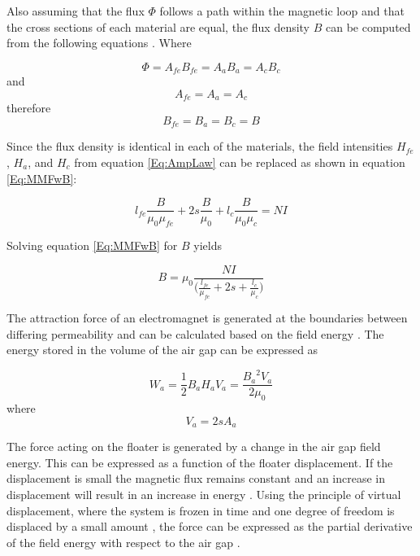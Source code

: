 Also assuming that the flux $\Phi$ follows a path within the magnetic loop and that the cross sections of each material are equal, the flux density $B$ can be computed from the following equations \cite{MagBear}. Where

\begin{equation}\label{Eq:BwFe}
\Phi={A}_{fe}{B}_{fe}={A}_{a}{B}_{a}={A}_{c}{B}_{c}
\end{equation}
 and
\begin{equation}\label{Eq:BwoFe}
{A}_{fe}={A}_{a}={A}_{c}
\end{equation}
therefore
\begin{equation}\label{Eq:BwFe}
{B}_{fe}={B}_{a}={B}_{c}=B
\end{equation}



Since the flux density is identical in each of the materials, the field intensities ${H}_{fe}$, ${H}_{a}$, and ${H}_{c}$ from equation \ref{Eq:AmpLaw} can be replaced as shown in equation \ref{Eq:MMFwB}:

\begin{equation}\label{Eq:MMFwB}
{l}_{fe}\frac{B}{{\mu}_{0}{\mu}_{fe}}+2s\frac{B}{{\mu}_{0}}+{l}_{c}\frac{B}{{\mu}_{0}{\mu}_{c}}=NI
\end{equation}

Solving equation \ref{Eq:MMFwB} for $B$ yields

\begin{equation}\label{Eq:B}
B={\mu}_{0}\frac{NI}{\Big(\frac{{l}_{fe}}{{\mu}_{fe}}+2s+\frac{{l}_{c}}{{\mu}_{c}}\Big)}
\end{equation}


The attraction force of an electromagnet is generated at the boundaries between differing permeability and can be calculated based on the field energy \cite{MagBear}.  The energy stored in the volume of the air gap can be expressed as

\begin{equation}\label{Eq:Wa}
{W}_{a}=\frac{1}{2}{B}_{a}{H}_{a}{V}_{a}=\frac{{{B}_{a}}^{2}{V}_{a}}{2{\mu}_{0}}
\end{equation}
where
\begin{equation}\label{Eq:Va}
{V}_{a}=2s{A}_{a}
\end{equation}

The force acting on the floater is generated by a change in the air gap field energy. This can be expressed as a function of the floater displacement. If the displacement is small the magnetic flux remains constant and an increase in displacement will result in an increase in energy \cite{MagBear}. Using the principle of virtual displacement, where the system is frozen in time and one degree of freedom is displaced by a small amount \cite{AnaMech}, the force can be expressed as the partial derivative of the field energy with respect to the air gap \cite{MagBear}.

